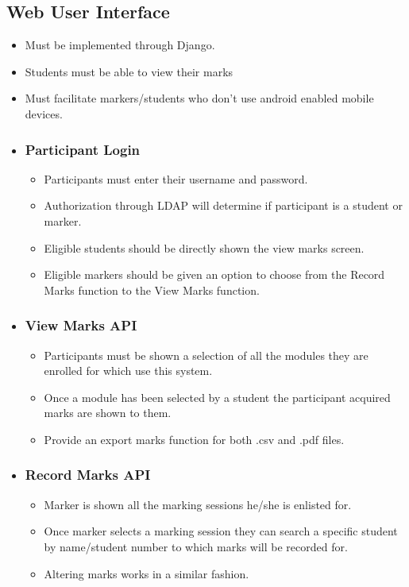 \documentclass[10pt,a4paper]{article}
\begin{document}
	\subsection*{Web User Interface}
	\begin{itemize}
		\item Must be implemented through Django.
  		\item Students must be able to view their marks
  		\item Must facilitate markers/students who don't use android enabled mobile devices.
  		
		\item \subsubsection*{Participant Login}
		\begin{itemize}
			\item Participants must enter their username and password.
			\item Authorization through LDAP will determine if participant is a student or marker. 
			\item Eligible students should be directly shown the view marks screen.
			\item Eligible markers should be given an option to choose from the Record Marks function to the View Marks function.
		\end{itemize}
		
		\item \subsubsection*{View Marks API}
		\begin{itemize}
			\item Participants must be shown a selection of all the modules they are enrolled for which use this system. 
			\item Once a module has been selected by a student the participant acquired marks are shown to them.
			\item Provide an export marks function for both .csv and .pdf files.
		\end{itemize}
		
		\item \subsubsection*{Record Marks API}
		\begin{itemize}
			\item Marker is shown all the marking sessions he/she is enlisted for.
			\item Once marker selects a marking session they can search a specific student by name/student number to which marks will be recorded for.
			\item Altering marks works in a similar fashion.
		\end{itemize}
	\end{itemize}
	
\end{document}
